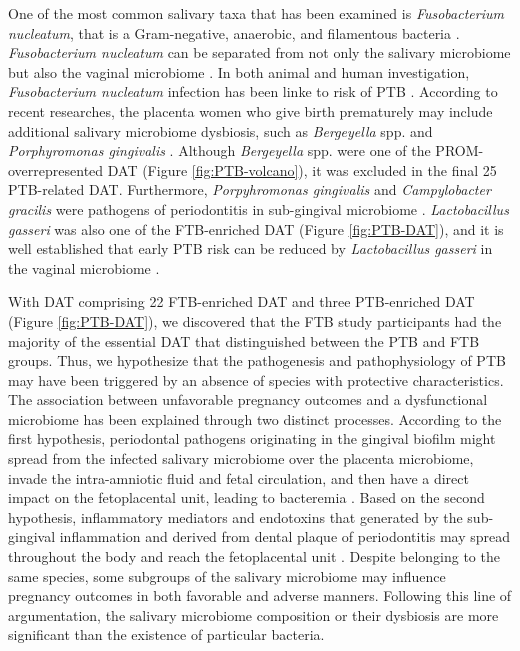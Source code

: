 \documentclass[11pt, a4paper, onecolumn, oneside]{report}
\begin{document}
            One of the most common salivary taxa that has been examined is \textit{Fusobacterium nucleatum}, that is a Gram-negative, anaerobic, and filamentous bacteria \cite{Fusobacterium-1, Fusobacterium-2, Fusobacterium-3}. \textit{Fusobacterium nucleatum} can be separated from not only the salivary microbiome but also the vaginal microbiome \cite{PTB-mechanism-7, PTB-mechanism-8}. In both animal and human investigation, \textit{Fusobacterium nucleatum} infection has been linke to risk of PTB \cite{Fusobacterium-4}. According to recent researches, the placenta women who give birth prematurely may include additional salivary microbiome dysbiosis, such as \textit{Bergeyella} spp. and \textit{Porphyromonas gingivalis} \cite{Porphyromonas-1, Porphyromonas-2}. Although \textit{Bergeyella} spp. were one of the PROM-overrepresented DAT (Figure \ref{fig:PTB-volcano}), it was excluded in the final 25 PTB-related DAT. Furthermore,  \textit{Porpyhromonas gingivalis} and \textit{Campylobacter gracilis} were pathogens of periodontitis in sub-gingival microbiome \cite{PTB-mechanism-9}. \textit{Lactobacillus gasseri} was also one of the FTB-enriched DAT (Figure \ref{fig:PTB-DAT}), and it is well established that early PTB risk can be reduced by \textit{Lactobacillus gasseri} in the vaginal microbiome \cite{PTB-mechanism-10, PTB-mechanism-11}.

            With DAT comprising 22 FTB-enriched DAT and three PTB-enriched DAT (Figure \ref{fig:PTB-DAT}), we discovered that the FTB study participants had the majority of the essential DAT that distinguished between the PTB and FTB groups. Thus, we hypothesize that the pathogenesis and pathophysiology of PTB may have been triggered by an absence of species with protective characteristics. The association between unfavorable pregnancy outcomes and a dysfunctional microbiome has been explained through two distinct processes. According to the first hypothesis, periodontal pathogens originating in the gingival biofilm might spread from the infected salivary microbiome over the placenta microbiome, invade the intra-amniotic fluid and fetal circulation, and then have a direct impact on the fetoplacental unit, leading to bacteremia \cite{Periodontitis-1}. Based on the second hypothesis, inflammatory mediators and endotoxins that generated by the sub-gingival inflammation and derived from dental plaque of periodontitis may spread throughout the body and reach the fetoplacental unit \cite{PTB-mechanism-12, PTB-mechanism-13}. Despite belonging to the same species, some subgroups of the salivary microbiome may influence pregnancy outcomes in both favorable and adverse manners. Following this line of argumentation, the salivary microbiome composition or their dysbiosis are more significant than the existence of particular bacteria.
\end{document}
